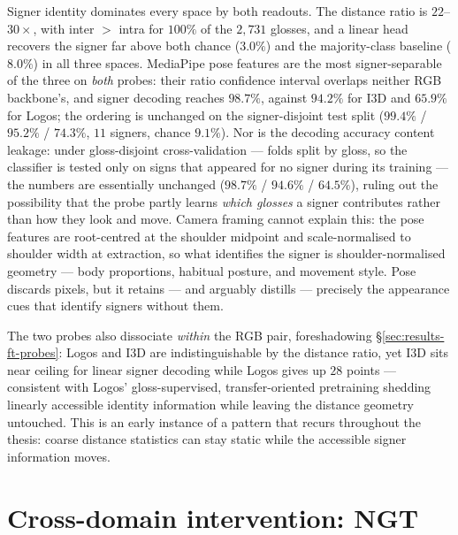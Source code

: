 Signer identity dominates every space by both readouts. The distance
ratio is $22$--$30\times$, with inter $>$ intra for $100\%$ of the
$2{,}731$ glosses, and a linear head recovers the signer far above both
chance ($3.0\%$) and the majority-class baseline ($8.0\%$) in all three
spaces. MediaPipe pose features are the most signer-separable of the
three on \emph{both} probes: their ratio confidence interval overlaps
neither RGB backbone's, and signer decoding reaches $98.7\%$, against
$94.2\%$ for I3D and $65.9\%$ for Logos; the ordering is unchanged on
the signer-disjoint test split ($99.4\%$ / $95.2\%$ / $74.3\%$, $11$
signers, chance $9.1\%$).
Nor is the decoding accuracy content leakage: under gloss-disjoint
cross-validation --- folds split by gloss, so the classifier is tested
only on signs that appeared for no signer during its training --- the
numbers are essentially unchanged ($98.7\%$ / $94.6\%$ / $64.5\%$),
ruling out the possibility that the probe partly learns \emph{which
glosses} a signer contributes rather than how they look and move.
Camera framing cannot explain this: the pose
features are root-centred at the shoulder midpoint and scale-normalised
to shoulder width at extraction, so what identifies the signer is
shoulder-normalised geometry --- body proportions, habitual posture, and
movement style. Pose discards pixels, but it retains --- and arguably
distills --- precisely the appearance cues that identify signers without
them.

The two probes also dissociate \emph{within} the RGB pair, foreshadowing
\S\ref{sec:results-ft-probes}: Logos and I3D are indistinguishable by
the distance ratio, yet I3D sits near ceiling for linear signer decoding
while Logos gives up $28$ points --- consistent with Logos' gloss-supervised,
transfer-oriented pretraining shedding linearly accessible identity
information while leaving the distance geometry untouched. This is an
early instance of a pattern that recurs throughout the thesis: coarse
distance statistics can stay static while the accessible signer
information moves.

\section{Cross-domain intervention: NGT}
\label{sec:results-crossdomain}


